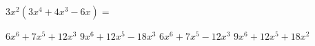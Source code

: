 
\question $3x^2(3x^4 + 4x^3 - 6x) = $

  \begin{oneparchoices}
    \choice $6x^6 + 7x^5 + 12x^3$
    \CorrectChoice $9x^6 + 12x^5 - 18x^3$
    \choice $6x^6 + 7x^5 - 12x^3$
    \choice $9x^6 + 12x^5 + 18x^2$
  \end{oneparchoices}
